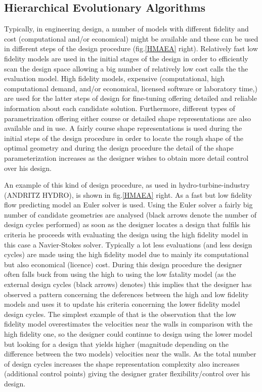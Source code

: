 \subsection{Hierarchical Evolutionary Algorithms}
Typically, in engineering design, a number of models with different fidelity and cost (computational and/or economical) might be available and these can be used in different steps of the design procedure (fig.\ref{HMAEA} right). Relatively fast low fidelity models are used in the initial stages of the design in order to efficiently scan the design space allowing a big number of relatively low cost calls the the evaluation model. High fidelity models, expensive (computational, high computational demand, and/or economical, licensed software or laboratory time,) are used for the latter steps of design for fine-tuning offering detailed and reliable information about each candidate solution. Furthermore, different types of parametrization offering either course or detailed shape representations are also available and in use. A fairly course shape representations is used during the initial steps of the design procedure in order to locate the rough shape of the optimal geometry and during the design procedure the detail of the shape parameterization increases as the designer wishes to obtain more detail control over his design.

An example of this kind of design procedure, as used in hydro-turbine-industry (ANDRITZ HYDRO), is shown in fig.\ref{HMAEA} right. As a fast but low fidelity flow predicting model an Euler solver is used. Using the Euler solver a fairly big number of candidate geometries are analysed (black arrows denote the number of design cycles performed) as soon as the designer locates a design that fulfils his criteria he proceeds with evaluating the design using the high fidelity model in this case a Navier-Stokes solver.  Typically a lot less evaluations (and less design cycles) are made using the high fidelity model due to mainly its computational but also economical (licence) cost.  During this design procedure the designer often falls buck from using the high to using the low fatality model (as the external design cycles (black arrows) denotes) this implies that the designer has observed a pattern concerning the deferences between the high and low fidelity models and uses it to update his criteria concerning the lower fidelity model design cycles. The simplest example of that is the observation that the low fidelity model overestimates the velocities near the walls in comparison with the high fidelity one, so the designer could continue to design using the lower model but looking for a design that yields higher (magnitude depending on the difference between the two models) velocities near the walls. As the total number of design cycles increases the shape representation complexity also increases (additional control points) giving the designer grater flexibility/control over his design.      


